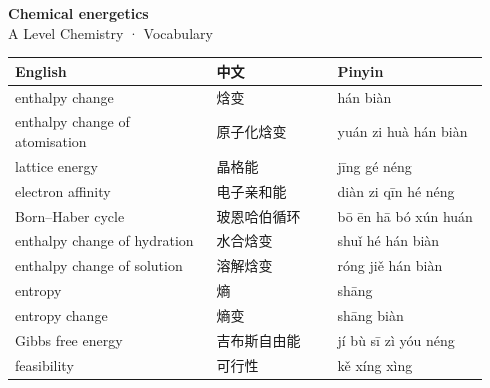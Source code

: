 \documentclass[11pt]{article}
\begin{document}
\begin{center}
  {\LARGE\bfseries Chemical energetics}\\[0.35em]
  {\large A Level Chemistry · Vocabulary}
\end{center}
\vspace{0.6em}

\begin{longtable}{@{}p{0.40\linewidth}p{0.24\linewidth}p{0.30\linewidth}@{}}
\toprule
\textbf{English} & \textbf{中文} & \textbf{Pinyin} \\
\midrule
\endhead
\bottomrule
\endlastfoot
enthalpy change & 焓变 & hán biàn \\
enthalpy change of atomisation & 原子化焓变 & yuán zi huà hán biàn \\
lattice energy & 晶格能 & jīng gé néng \\
electron affinity & 电子亲和能 & diàn zi qīn hé néng \\
Born–Haber cycle & 玻恩哈伯循环 & bō ēn hā bó xún huán \\
enthalpy change of hydration & 水合焓变 & shuǐ hé hán biàn \\
enthalpy change of solution & 溶解焓变 & róng jiě hán biàn \\
entropy & 熵 & shāng \\
entropy change & 熵变 & shāng biàn \\
Gibbs free energy & 吉布斯自由能 & jí bù sī zì yóu néng \\
feasibility & 可行性 & kě xíng xìng \\
\end{longtable}
\end{document}
